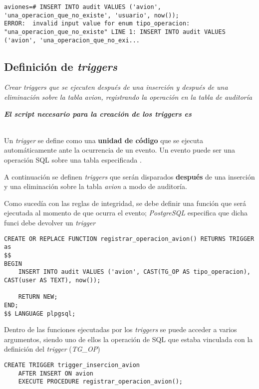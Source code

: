 \lstset{style=sql}
\begin{lstlisting}
aviones=# INSERT INTO audit VALUES ('avion', 'una_operacion_que_no_existe', 'usuario', now());
ERROR:  invalid input value for enum tipo_operacion: "una_operacion_que_no_existe" LINE 1: INSERT INTO audit VALUES ('avion', 'una_operacion_que_no_exi...
\end{lstlisting}

\subsection{Definición de \emph{triggers}}

\emph{Crear triggers que se ejecuten después de una inserción y después de una eliminación sobre la tabla \emph{avion}, registrando la operación en la tabla de auditoría} 

\emph{\textbf{El script necesario para la creación de los triggers es }} 


~\\

Un \emph{trigger} se define como una \textbf{unidad de código} que se ejecuta automáticamente ante la ocurrencia de un evento. Un evento puede ser una operación SQL sobre una tabla especificada \cite{trigger}.

A continuación se definen \emph{triggers} que serán disparados \textbf{después} de una inserción y una eliminación sobre la tabla \emph{avion} a modo de auditoría.

Como sucedía con las reglas de integridad, se debe definir una función que será ejecutada al momento de que ocurra el evento; \emph{PostgreSQL} especifica que dicha funci debe devolver un \emph{trigger}  

\clearpage
\lstset{style=sql}
\begin{lstlisting}
CREATE OR REPLACE FUNCTION registrar_operacion_avion() RETURNS TRIGGER as 
$$
BEGIN
    INSERT INTO audit VALUES ('avion', CAST(TG_OP AS tipo_operacion), CAST(user AS TEXT), now());

    RETURN NEW;
END;
$$ LANGUAGE plpgsql;
\end{lstlisting}

Dentro de las funciones ejecutadas por los \emph{triggers} se puede acceder a varios argumentos, siendo uno de ellos la operación de SQL que estaba vinculada con la definición del \emph{trigger} (\emph{TG\_OP})  

\vspace*{5mm}
\lstset{style=sql}
\begin{lstlisting}
CREATE TRIGGER trigger_insercion_avion 
    AFTER INSERT ON avion
    EXECUTE PROCEDURE registrar_operacion_avion();
\end{lstlisting}

